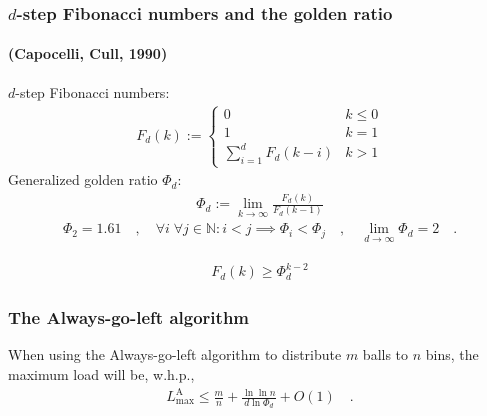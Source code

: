 \documentclass[serif,professionalfonts]{beamer}
\newcommand\load{L_{\mathrm{max}}}
\newcommand\loadAgl{\load^{\mathrm{A}}}
\begin{document}
\begin{frame}
\frametitle{$d$-step Fibonacci numbers and the golden ratio}
\framesubtitle{(Capocelli, Cull, 1990)}

$d$-step Fibonacci numbers:
\begin{align*}
F_d(k) := \begin{cases}
                0               & k \leq 0\\
                1               & k = 1\\
                \sum_{i=1}^{d}F_d(k-i) & k > 1
            \end{cases}
\end{align*}
Generalized golden ratio $\Phi_d$:
\begin{align*}
\Phi_d := \lim_{k \rightarrow \infty} \frac{F_d(k)}{F_d(k-1)}
\end{align*}
\begin{align*}
\Phi_2 = 1.61 \quad , \quad \forall i\; \forall j \in \mathbb{N}: i < j \implies \Phi_i < \Phi_j \quad , \quad \lim_{d\rightarrow \infty} \Phi_d = 2 \quad .
\end{align*}

\begin{align*}
F_d(k) \geq \Phi_d^{k-2}
\end{align*}
\end{frame}

\newcommand\theoremVocking{
\begin{theorem}[V\"ocking, 2003]
When using the \alert{Always-go-left} algorithm to distribute $m$ balls to $n$ bins, the maximum load will be, w.h.p.,
\begin{align*}
\loadAgl \leq \frac{m}{n} + \frac{\ln \ln n}{d \ln \Phi_d} + O(1) \quad .
\end{align*}
\end{theorem}
}

\begin{frame}[shrink]
\frametitle{The Always-go-left algorithm}
\aglAlgorithm

\theoremVocking
\end{frame}
\end{document}
